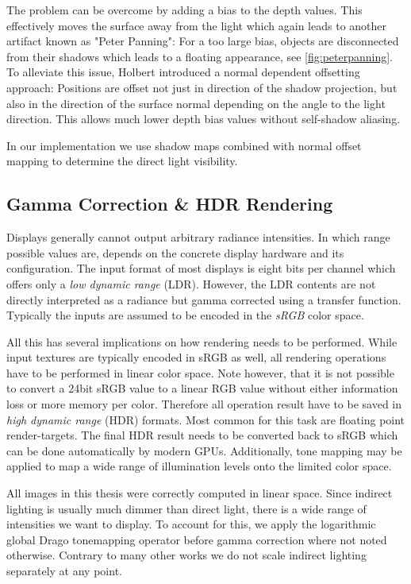 \documentclass[thesis.tex]{subfiles}
\begin{document}
The problem can be overcome by adding a bias to the depth values.
This effectively moves the surface away from the light which again leads to another artifact known as "Peter Panning":
For a too large bias, objects are disconnected from their shadows which leads to a floating appearance, see \autoref{fig:peterpanning}.
\\
To alleviate this issue, Holbert \cite{bib:normaloffsetshadowmapping} introduced a normal dependent offsetting approach:
Positions are offset not just in direction of the shadow projection, but also in the direction of the surface normal depending on the angle to the light direction.
This allows much lower depth bias values without self-shadow aliasing.

In our implementation we use shadow maps combined with normal offset mapping to determine the direct light visibility.

\subsection{Gamma Correction \& HDR Rendering}
Displays generally cannot output arbitrary radiance intensities.
In which range possible values are, depends on the concrete display hardware and its configuration.
The input format of most displays is eight bits per channel which offers only a \emph{low dynamic range} (LDR).
However, the LDR contents are not directly interpreted as a radiance but gamma corrected using a transfer function.
Typically the inputs are assumed to be encoded in the \emph{sRGB} color space.

All this has several implications on how rendering needs to be performed.
While input textures are typically encoded in sRGB as well, all rendering operations have to be performed in linear color space.
Note however, that it is not possible to convert a 24bit sRGB value to a linear RGB value without either information loss or more memory per color.
Therefore all operation result have to be saved in \emph{high dynamic range} (HDR) formats.
Most common for this task are floating point render-targets.
The final HDR result needs to be converted back to sRGB which can be done automatically by modern GPUs.
Additionally, tone mapping may be applied to map a wide range of illumination levels onto the limited color space.

All images in this thesis were correctly computed in linear space.
Since indirect lighting is usually much dimmer than direct light, there is a wide range of intensities we want to display.
To account for this, we apply the logarithmic global Drago tonemapping operator \cite{bib:tonemapdrago} before gamma correction where not noted otherwise.
Contrary to many other works we do not scale indirect lighting separately at any point.
\end{document}
